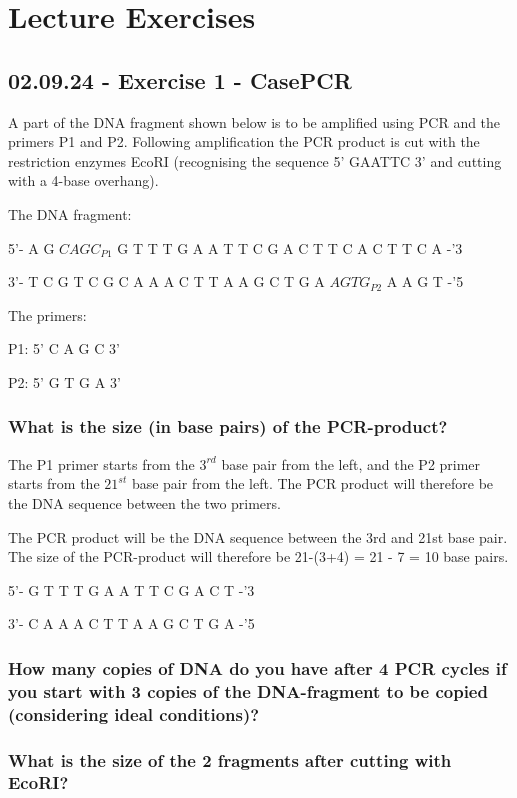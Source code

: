 \chapter{Lecture Exercises}

\section{02.09.24 - Exercise 1 - CasePCR}
A part of the DNA fragment shown below is to be amplified using PCR and the primers P1 and P2. Following amplification the PCR product is cut with the restriction enzymes EcoRI (recognising the sequence 5’ GAATTC 3’ and cutting with a 4-base overhang).

The DNA fragment:

5'-	A G	\underline{$C A G C_{P1}$}	G T	T T	G A	A T	T C	G A	C T	T C	A C	T T	C A	-'3

3'-	T C	G T	C G	C A	A A	C T	T A	A G	C T	G A	\underline{$A G T G_{P2}$}	A A	G T	-'5

The primers:

P1: 5’ C A G C 3’	

P2: 5’ G T G A 3’




\subsection*{What is the size (in base pairs) of the PCR-product?}
The P1 primer starts from the $3^{rd}$ base pair from the left, and the P2 primer starts from the $21^{st}$ base pair from the left. The PCR product will therefore be the DNA sequence between the two primers.

The PCR product will be the DNA sequence between the 3rd and 21st base pair. The size of the PCR-product will therefore be 21-(3+4) = 21 - 7 = 10 base pairs.

5'- G T T T G A A T T C G A C T -'3

3'- C A A A C T T A A G C T G A -'5



\subsection*{How many copies of DNA do you have after 4 PCR cycles if you start with 3 copies of the DNA-fragment to be copied (considering ideal conditions)?}


\subsection*{What is the size of the 2 fragments after cutting with EcoRI?}


